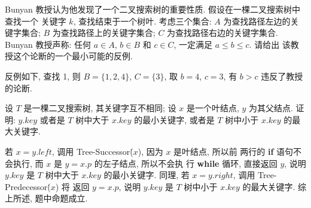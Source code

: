 \documentclass[boxes]{homework}
\begin{document}
\begin{problem}
Bunyan 教授认为他发现了一个二叉搜索树的重要性质. 假设在一棵二叉搜索树中查找一个
关键字 $k$, 查找结束于一个树叶. 考虑三个集合: $A$ 为查找路径左边的关键字集合;
$B$ 为查找路径上的关键字集合; $C$ 为查找路径右边的关键字集合. Bunyan 教授声称:
任何 $a\in A$, $b\in B$ 和 $c\in C$, 一定满足 $a\leqslant b\leqslant c$. 请给出
该教授这个论断的一个最小可能的反例.
\end{problem}
\begin{solution}
    反例如下, 查找 1, 则 $B = \{1, 2, 4\}$, $C = \{3\}$, 取 $b = 4$, $c = 3$, 有
    $b > c$ 违反了教授的论断.
    \begin{center}
    \end{center}
\end{solution}

\begin{problem}
设 $T$ 是一棵二叉搜索树, 其关键字互不相同; 设 $x$ 是一个叶结点, $y$ 为其父结点.
证明: $y.key$ 或者是 $T$ 树中大于 $x.key$ 的最小关键字, 或者是 $T$ 树中小于
$x.key$ 的最大关键字.
\end{problem}
\begin{solution}
    若 $x = y.left$, 调用 {\sc Tree-Successor}\.($x$), 因为 $x$ 是叶结点, 所以前
    两行的 \textbf{if} 语句不会执行, 而 $x$ 是 $y = x.p$ 的左子结点, 所以不会执
    行 \textbf{while} 循环, 直接返回 $y$, 说明 $y.key$ 是 $T$ 树中大于 $x.key$
    的最小关键字. 同理, 若 $x = y.right$, 调用 {\sc Tree-Predecessor}\.($x$) 将
    返回 $y = x.p$, 说明 $y.key$ 是 $T$ 树中小于 $x.key$ 的最大关键字. 综上所述,
    题中命题成立.
\end{solution}
\end{document}
